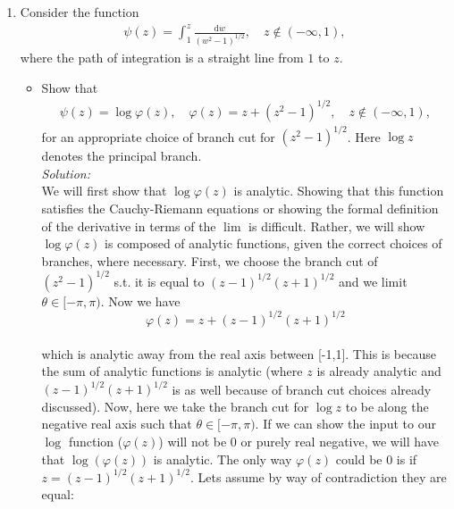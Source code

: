 \documentclass[10pt]{amsart}
\newcommand{\D}{\mathrm{d}}
\newcommand{\I}{\mathrm{i}}
\DeclareMathOperator{\E}{e}
\theoremstyle{nonumberplain}
\begin{document}
\begin{enumerate}[label={\bf {\arabic*}:}]
\begin{figure}[h]
 	\caption{
	From problem 4, plot lot $f_1(z) = s(z^2 -1)$, $f_2(z) = s(z-1) s(z+1)$, where $s(z) = z^{1/2} = \rho^{1/2} \E^{\I \theta/2},\:\:
	\theta \in [-\pi,\pi)$, denote the principal branch of the square root.}\label{fig:f1}
\end{figure}
\textbf{Your mathematical argument can be to just show an example where they don't agree.}
\noindent
Come up with your counter example...

  \item Consider the function
    \begin{align*}
     \psi(z) = \int_1^z \frac{\D w}{(w^2 - 1)^{1/2}}, \quad z \not \in
      (-\infty, 1),
    \end{align*}
    where the path of integration is a straight line from $1$ to $z$.
    \begin{itemize}
   \item  Show that
    \begin{align*}
      \psi(z) = \log \varphi(z), \quad \varphi(z) = z + (z^2 -
      1)^{1/2}, \quad z \not \in
      (-\infty, 1),
    \end{align*}
   for an appropriate choice of branch cut for $(z^2 -
   1)^{1/2}$.  Here $\log z$ denotes the principal branch. \\
   \textit{Solution:} \\
   We will first show that $\log \varphi(z)$ is analytic.
   Showing that this function satisfies the Cauchy-Riemann equations or showing the formal definition of the derivative in terms of the $\lim$ is difficult. 
   Rather, we will show $\log \varphi(z)$ is composed of analytic functions, given the correct choices of branches, where necessary.
   First, we choose the branch cut of $(z^2 - 1)^{1/2}$ s.t. it is equal to $(z - 1)^{1/2} (z + 1)^{1/2}$ and we limit $\theta \in [-\pi, \pi)$.
   Now we have \\
   $$\varphi(z) = z + (z - 1)^{1/2}(z + 1)^{1/2}$$ \\
   which is analytic away from the real axis between [-1,1]. This is because the sum of analytic functions is analytic (where $z$ is already analytic and $(z - 1)^{1/2}(z + 1)^{1/2}$ is as well because of branch cut choices already discussed). Now, here we take the branch cut for $\log z$ to be along the negative real axis such that $\theta \in [-\pi, \pi)$. If we can show the input to our $\log$ function ($\varphi(z)$) will not be 0 or purely real negative, we will have that $\log(\varphi(z))$ is analytic. The only way $\varphi(z)$ could be 0 is if $z = (z - 1)^{1/2}(z + 1)^{1/2}$. Lets assume by way of contradiction they are equal:

\end{itemize}
\end{enumerate}
\end{document}
